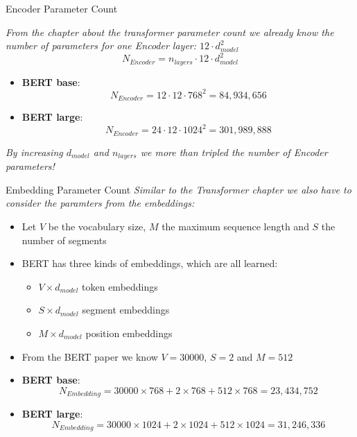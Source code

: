 \documentclass[11pt,compress,t,notes=noshow, xcolor=table]{beamer}
\begin{document}

\begin{frame}{Encoder Parameter Count}

\textit{From the chapter about the transformer parameter count we already know the number of parameters for one Encoder layer: $12\cdot d_{model}^2$}
$$
N_{Encoder} = n_{layers} \cdot 12\cdot d_{model}^2
$$

\begin{itemize}
	\item \textbf{BERT base}:
	$$N_{Encoder} = 12\cdot 12\cdot 768^2 = 84,934,656$$
	\item \textbf{BERT large}:
	$$N_{Encoder} = 24\cdot 12\cdot 1024^2 = 301,989,888$$
\end{itemize}

\textit{By increasing $d_{model}$ and $n_{layers}$ we more than tripled the number of Encoder parameters!}
\end{frame}


\begin{frame}{Embedding Parameter Count}
\textit{Similar to the Transformer chapter we also have to consider the paramters from the embeddings:}

\begin{itemize}
	\item Let $V$ be the vocabulary size, $M$ the maximum sequence length and $S$ the number of segments
	\item BERT has three kinds of embeddings, which are all learned:
	\begin{itemize}
		\item $V \times d_{model}$ token embeddings
		\item $S \times d_{model}$ segment embeddings
		\item $M \times d_{model}$ position embeddings
	\end{itemize}
	\item From the BERT paper we know $V=30000$, $S = 2$ and $M = 512$ 
	\item \textbf{BERT base}:
	$$N_{Embedding} = 30000\times 768 + 2\times 768 + 512\times 768 = 23,434,752$$
	\item \textbf{BERT large}:
	$$N_{Embedding} = 30000\times 1024 +2\times 1024 + 512\times 1024 = 31,246,336$$
\end{itemize}
	
\end{frame}
\end{document}
